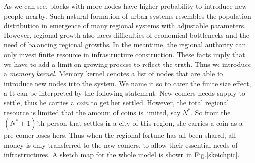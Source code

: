 \documentclass[reprint,unsortedaddress,amsmath,amssymb,aps,prl,showkeys]{revtex4-2}
\begin{document}
As we can see, blocks with more nodes have higher probability to introduce new people nearby. Such natural formation of urban systems resembles the population distribution in emergence of many regional systems with adjustable parameters. However, regional growth also faces difficulties of economical bottlenecks and the need of balancing regional growths. In the meantime, the regional authority can only invest finite resource in infrastructure construction. These facts imply that we have to add a limit on growing process to reflect the truth. Thus we introduce a \emph{memory kernel}. Memory kernel denotes a list of nodes that are able to introduce new nodes into the system. We name it so to cater the finite size effect, a  It can be interpreted by the following statement: New comers needs supply to settle, thus he carries a \emph{coin} to get her settled. However, the total regional resource is limited that the amount of coins is limited, say $N^*$. So from the $(N^*+1)$'th person that settles in a city of this region, she carries a coin as a pre-comer loses hers. Thus when the regional fortune has all been shared, all money is only transferred to the new comers, to allow their essential needs of infrastructures. A sketch map for the whole model is shown in Fig.\@\ref{sketchpic}.
\end{document}
